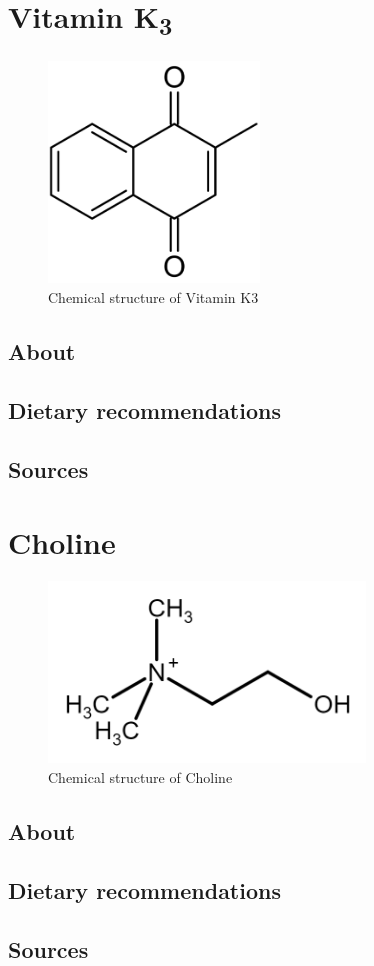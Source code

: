 \documentclass{book}
\begin{document}
\chapter{Vitamin K\textsubscript{3}}
\begin{figure}[h]
	\caption{Chemical structure of Vitamin K3}
	\centering \includegraphics[width=0.5\textwidth]{images/Vitamin_K3_chemical_structure}
\end{figure}
\newpage

\section{About}


\section{Dietary recommendations}


\section{Sources}


\chapter{Choline}
\begin{figure}[h]
	\caption{Chemical structure of Choline}
	\centering \includegraphics[width=0.75\textwidth]{images/Choline_chemical_structure}
\end{figure}
\newpage

\section{About}


\section{Dietary recommendations}


\section{Sources}


\listoffigures


\listoftables
\end{document}

